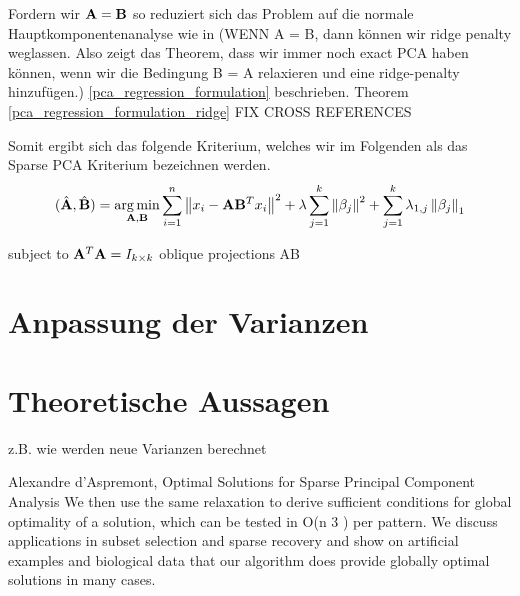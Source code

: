Fordern wir $\mathbf{A} =  \mathbf{B}$ so reduziert sich das Problem auf die normale Hauptkomponentenanalyse wie in (WENN A = B, dann können wir ridge penalty weglassen. Also zeigt das Theorem, dass wir immer noch exact PCA haben können, wenn wir die Bedingung B = A relaxieren und eine ridge-penalty hinzufügen.) \ref{pca_regression_formulation} beschrieben.
Theorem \ref{pca_regression_formulation_ridge} FIX CROSS REFERENCES

Somit ergibt sich das folgende Kriterium, welches wir im Folgenden als das Sparse PCA Kriterium bezeichnen werden.
$$(\hat{\mathbf{A}}, \hat{\mathbf{B}}) = \operatorname*{arg\,min}_{\mathbf{A}, \mathbf{B}} \sum_{i=1}^{n} \left\lVert x_i - \mathbf{A}\mathbf{B}^Tx_i \right\rVert^2 + \lambda \sum_{j=1}^{k}\left\lVert \beta_j \right\rVert^2 + \sum_{j=1}^k \lambda_{1,j} \left\lVert \beta_j \right\rVert_1$$

subject to $\mathbf{A}^T\mathbf{A} = I_{k \times k}$
oblique projections AB

\section{Anpassung der Varianzen}

\section{Theoretische Aussagen} \label{theoretical results}
z.B. wie werden neue Varianzen berechnet

Alexandre d’Aspremont, Optimal Solutions for Sparse Principal Component Analysis
We then use the same relaxation to derive sufficient conditions for global optimality of a
solution, which can be tested in O(n
3
) per pattern. We discuss applications in subset selection and
sparse recovery and show on artificial examples and biological data that our algorithm does provide
globally optimal solutions in many cases.